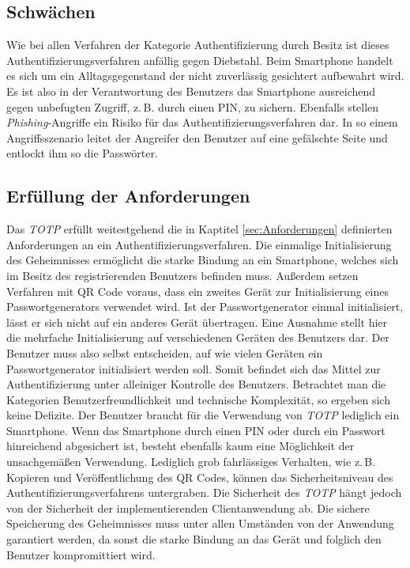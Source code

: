 \documentclass[11pt,a4paper,ngerman]{scrreprt}
\begin{document}
\subsection{Schwächen}
Wie bei allen Verfahren der Kategorie Authentifizierung durch Besitz ist dieses Authentifizierungsverfahren anfällig gegen Diebstahl. Beim Smartphone handelt es sich um ein Alltagsgegenstand der nicht zuverlässig gesichtert aufbewahrt wird. Es ist also in der Verantwortung des Benutzers das Smartphone ausreichend gegen unbefugten Zugriff, z.\,B. durch einen PIN, zu sichern. Ebenfalls stellen \textit{Phishing}-Angriffe ein Risiko für das Authentifizierungsverfahren dar. In so einem Angriffsszenario leitet der Angreifer den Benutzer auf eine gefälschte Seite und entlockt ihm so die Passwörter.

\subsection{Erfüllung der Anforderungen}
Das \textit{TOTP} erfüllt weitestgehend die in Kaptitel \ref{sec:Anforderungen} definierten Anforderungen an ein Authentifizierungsverfahren. Die einmalige Initialisierung des Geheimnisses ermöglicht die starke Bindung an ein Smartphone, welches sich im Besitz des registrierenden Benutzers befinden muss. Außerdem setzen Verfahren mit QR Code voraus, dass ein zweites Gerät zur Initialisierung eines Passwortgenerators verwendet wird. Ist der Passwortgenerator einmal initialisiert, lässt er sich nicht auf ein anderes Gerät übertragen. Eine Ausnahme stellt hier die mehrfache Initialisierung auf verschiedenen Geräten des Benutzers dar. Der Benutzer muss also selbst entscheiden, auf wie vielen Geräten ein Passwortgenerator initialisiert werden soll. Somit befindet sich das Mittel zur Authentifizierung unter alleiniger Kontrolle des Benutzers. Betrachtet man die Kategorien Benutzerfreundlichkeit und technische Komplexität, so ergeben sich keine Defizite. Der Benutzer braucht für die Verwendung von \textit{TOTP} lediglich ein Smartphone. Wenn das Smartphone durch einen PIN oder durch ein Passwort hinreichend abgesichert ist, besteht ebenfalls kaum eine Möglichkeit der unsachgemäßen Verwendung. Lediglich grob fahrlässiges Verhalten, wie z.\,B. Kopieren und Veröffentlichung des QR Codes, können das Sicherheitsniveau des Authentifizierungsverfahrens untergraben. Die Sicherheit des \textit{TOTP} hängt jedoch von der Sicherheit der implementierenden Clientanwendung ab. Die sichere Speicherung des Geheimnisses muss unter allen Umständen von der Anwendung garantiert werden, da sonst die starke Bindung an das Gerät und folglich den Benutzer kompromittiert wird.
\end{document}
